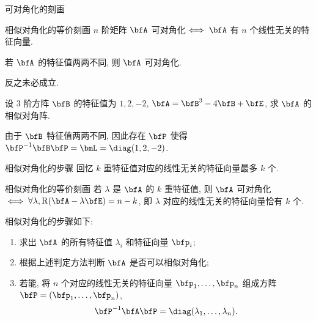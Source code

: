 \begin{frame}{可对角化的刻画}
	\onslide<+->
	\begin{algorithm}{相似对角化的等价刻画}
		$n$ 阶矩阵 $\bfA$ 可对角化$\iff\bfA$ 有 $n$ 个线性无关的特征向量.
	\end{algorithm}
	\onslide<+->
	\begin{corollary}
		若 $\bfA$ 的特征值两两不同, 则 $\bfA$ 可对角化.
	\end{corollary}
	\onslide<+->
	\alert{反之未必成立}.
	\onslide<+->
	\begin{example}
		设 $3$ 阶方阵 $\bfB$ 的特征值为 $1,2,-2$, $\bfA=\bfB^3-4\bfB+\bfE$, 求 $\bfA$ 的相似对角阵.
	\end{example}
	\onslide<+->
	\begin{solution}
		由于 $\bfB$ 特征值两两不同, 因此存在 $\bfP$ 使得 $\bfP^{-1}\bfB\bfP=\bmL=\diag(1,2,-2)$.
		\vspace{-\baselineskip}
	\end{solution}
\end{frame}


\begin{frame}{相似对角化的步骤}
	\onslide<+->
	回忆 $k$ 重特征值对应的线性无关的特征向量最多 $k$ 个.
	\onslide<+->
	\begin{algorithm}{相似对角化的等价刻画}
		若 $\lambda$ 是 $\bfA$ 的 $k$ 重特征值, 则 $\bfA$ 可对角化 $\iff\forall\lambda, \rank(\bfA-\lambda\bfE)=n-k$, 即 $\lambda$ 对应的线性无关的特征向量恰有 $k$ 个.
	\end{algorithm}
	\onslide<+->
	相似对角化的步骤如下:
	\begin{enumerate}
		\item 求出 $\bfA$ 的所有特征值 $\lambda_i$ 和特征向量 $\bfp_i$;
		\item 根据上述判定方法判断 $\bfA$ 是否可以相似对角化;
		\item 若能, 将 $n$ 个对应的线性无关的特征向量 $\bfp_1,\dots,\bfp_n$ 组成方阵 $\bfP=(\bfp_1,\dots,\bfp_n)$, 
		\[\bfP^{-1}\bfA\bfP=\diag(\lambda_1,\dots,\lambda_n).\]
	\end{enumerate}
\end{frame}


